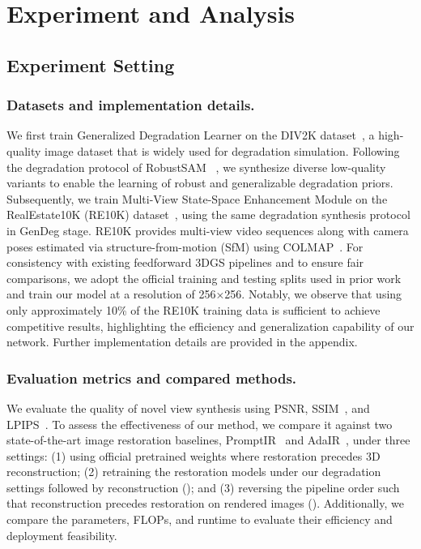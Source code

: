 \documentclass[letterpaper]{article} %
\newcommand{\NAMEfem}{Multi-View State-Space Enhancement Module\xspace}
\newcommand{\NAMEdeg}{Generalized Degradation Learner\xspace}
\begin{document}
\section{Experiment and Analysis}
\subsection{Experiment Setting}
\subsubsection{Datasets and implementation details.}

We first train \NAMEdeg on the DIV2K dataset~\cite{wang2021real}, a high-quality image dataset that is widely used for degradation simulation. Following the degradation protocol of RobustSAM ~\cite{chen2024robustsam}, we synthesize diverse low-quality variants to enable the learning of robust and generalizable degradation priors. Subsequently, we train \NAMEfem on the RealEstate10K (RE10K) dataset~\cite{zhou2018stereo}, using the same degradation synthesis protocol in GenDeg stage. RE10K provides multi-view video sequences along with camera poses estimated via structure-from-motion (SfM) using COLMAP~\cite{7780814}. For consistency with existing feedforward 3DGS pipelines and to ensure fair comparisons, we adopt the official training and testing splits used in prior work and train our model at a resolution of 256×256. Notably, we observe that using only approximately 10\% of the RE10K training data is sufficient to achieve competitive results, highlighting the efficiency and generalization capability of our network. Further implementation details are provided in the appendix.



\subsubsection{Evaluation metrics and compared methods.}
We evaluate the quality of novel view synthesis using PSNR, SSIM~\cite{wang2004image}, and LPIPS~\cite{zhang2018unreasonable}. To assess the effectiveness of our method, we compare it against two state-of-the-art image restoration baselines, PromptIR~\cite{potlapalli2023promptir} and AdaIR~\cite{cui2024adair}, under three settings: (1) using official pretrained weights where restoration precedes 3D reconstruction; (2) retraining the restoration models under our degradation settings followed by reconstruction (); and (3) reversing the pipeline order such that reconstruction precedes restoration on rendered images (). Additionally, we compare the parameters, FLOPs, and runtime to evaluate their efficiency and deployment feasibility. 
\end{document}
